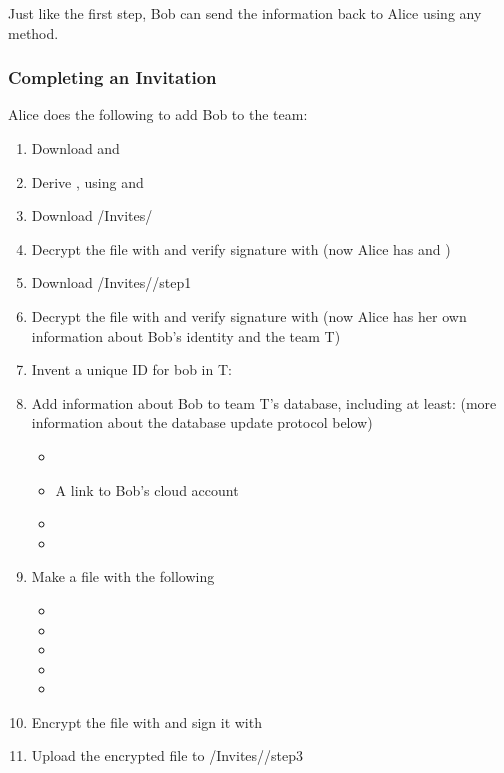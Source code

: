 \documentclass[pldi,10pt,preprint]{sigplanconf-pldi16}
\begin{document}
Just like the first step, Bob can send the information back to Alice using any method.

\subsubsection{Completing an Invitation}

Alice does the following to add Bob to the team:

\begin{enumerate}
\item Download  and 
\item Derive , using  and 
\item Download \slash Invites\slash {}
\item Decrypt the file with  and verify signature with  (now Alice has  and )
\item Download \slash Invites\slash {}\slash step1
\item Decrypt the file with  and verify signature with  (now Alice has her own information about Bob's identity and the team T)
\item Invent a unique ID for bob in T: 
\item Add information about Bob to team T's database, including at least: (more information about the database update protocol below)
  \begin{itemize}
  \item {}
  \item A link to Bob's cloud account
  \item {}
  \item {}
  \end{itemize}
\item Make a file with the following
  \begin{itemize}
  \item {}
  \item {}
  \item {}
  \item {}
  \item {}
  \end{itemize}
\item Encrypt the file with  and sign it with 
\item Upload the encrypted file to \slash Invites\slash {}\slash step3
\end{enumerate}
\end{document}
